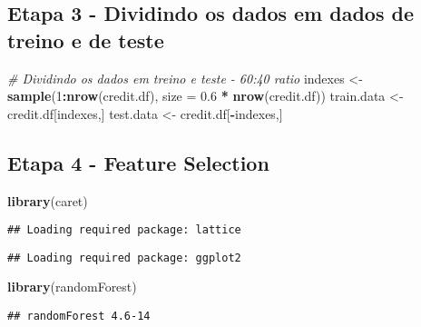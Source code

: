 \documentclass[
]{article}
\newenvironment{Shaded}{\begin{snugshade}}{\end{snugshade}}
\newcommand{\CommentTok}[1]{\textcolor[rgb]{0.56,0.35,0.01}{\textit{#1}}}
\newcommand{\DataTypeTok}[1]{\textcolor[rgb]{0.13,0.29,0.53}{#1}}
\newcommand{\DecValTok}[1]{\textcolor[rgb]{0.00,0.00,0.81}{#1}}
\newcommand{\FloatTok}[1]{\textcolor[rgb]{0.00,0.00,0.81}{#1}}
\newcommand{\KeywordTok}[1]{\textcolor[rgb]{0.13,0.29,0.53}{\textbf{#1}}}
\newcommand{\NormalTok}[1]{#1}
\newcommand{\OperatorTok}[1]{\textcolor[rgb]{0.81,0.36,0.00}{\textbf{#1}}}
\newcommand{\StringTok}[1]{\textcolor[rgb]{0.31,0.60,0.02}{#1}}
\begin{document}
\hypertarget{etapa-3---dividindo-os-dados-em-dados-de-treino-e-de-teste}{%
\subsection{Etapa 3 - Dividindo os dados em dados de treino e de
teste}\label{etapa-3---dividindo-os-dados-em-dados-de-treino-e-de-teste}}

\begin{Shaded}
\begin{Highlighting}[]
\CommentTok{# Dividindo os dados em treino e teste - 60:40 ratio}
\NormalTok{indexes <-}\StringTok{ }\KeywordTok{sample}\NormalTok{(}\DecValTok{1}\OperatorTok{:}\KeywordTok{nrow}\NormalTok{(credit.df), }\DataTypeTok{size =} \FloatTok{0.6} \OperatorTok{*}\StringTok{ }\KeywordTok{nrow}\NormalTok{(credit.df))}
\NormalTok{train.data <-}\StringTok{ }\NormalTok{credit.df[indexes,]}
\NormalTok{test.data <-}\StringTok{ }\NormalTok{credit.df[}\OperatorTok{-}\NormalTok{indexes,]}
\end{Highlighting}
\end{Shaded}

\hypertarget{etapa-4---feature-selection}{%
\subsection{Etapa 4 - Feature
Selection}\label{etapa-4---feature-selection}}

\begin{Shaded}
\begin{Highlighting}[]
\KeywordTok{library}\NormalTok{(caret) }
\end{Highlighting}
\end{Shaded}

\begin{verbatim}
## Loading required package: lattice
\end{verbatim}

\begin{verbatim}
## Loading required package: ggplot2
\end{verbatim}

\begin{Shaded}
\begin{Highlighting}[]
\KeywordTok{library}\NormalTok{(randomForest) }
\end{Highlighting}
\end{Shaded}

\begin{verbatim}
## randomForest 4.6-14
\end{verbatim}
\end{document}
